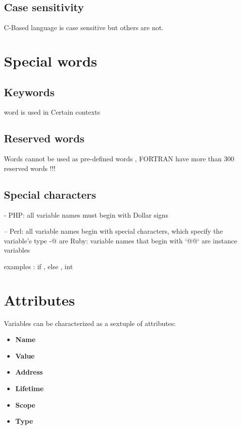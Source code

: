 \documentclass[12pt]{article}
\begin{document}
\subsection{Case sensitivity}

C-Based language is case sensitive but others are not.

\section{Special words}

\subsection{Keywords}
word is used in Certain contexts

\subsection{Reserved words}
Words cannot be used as pre-defined words , FORTRAN have more than 300 reserved words !!!

\subsection{Special characters}

- PHP: all variable names must begin with Dollar signs

– Perl: all variable names begin with special characters, which specify the variable’s type
-@ are Ruby: variable names that begin with `@@` are instance variables

examples : if , else , int

\section{Attributes}

Variables can be characterized as a sextuple of attributes:

\begin{itemize}
    \item \textbf{Name}
    \item \textbf{Value}
    \item \textbf{Address}
    \item \textbf{Lifetime}
    \item \textbf{Scope}
    \item \textbf{Type}
    \end{itemize}
\end{document}

